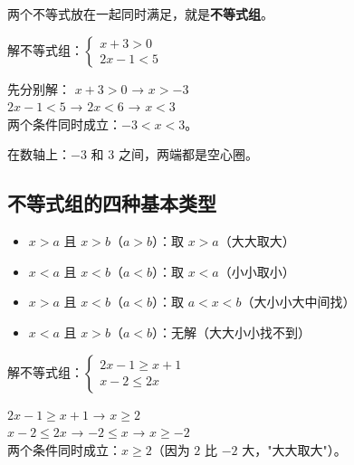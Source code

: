 
两个不等式放在一起同时满足，就是\textbf{不等式组}。

\begin{example}
解不等式组：$\begin{cases}x+3>0\\2x-1<5\end{cases}$
\end{example}
\begin{solution}
先分别解：
$x+3>0$ → $x>-3$\\
$2x-1<5$ → $2x<6$ → $x<3$\\
两个条件同时成立：$-3 < x < 3$。

在数轴上：$-3$ 和 $3$ 之间，两端都是空心圈。
\end{solution}

\subsection*{不等式组的四种基本类型}

\begin{itemize}
  \item $x>a$ 且 $x>b$（$a>b$）：取 $x>a$（大大取大）
  \item $x<a$ 且 $x<b$（$a<b$）：取 $x<a$（小小取小）
  \item $x>a$ 且 $x<b$（$a<b$）：取 $a<x<b$（大小小大中间找）
  \item $x<a$ 且 $x>b$（$a<b$）：无解（大大小小找不到）
\end{itemize}

\begin{example}
解不等式组：$\begin{cases}2x-1\ge x+1\\x-2\le 2x\end{cases}$
\end{example}
\begin{solution}
$2x-1\ge x+1$ → $x\ge2$\\
$x-2\le 2x$ → $-2\le x$ → $x\ge -2$\\
两个条件同时成立：$x\ge 2$（因为 $2$ 比 $-2$ 大，"大大取大"）。
\end{solution}

